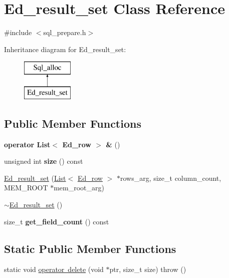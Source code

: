 \hypertarget{classEd__result__set}{}\section{Ed\+\_\+result\+\_\+set Class Reference}
\label{classEd__result__set}


{\ttfamily \#include $<$sql\+\_\+prepare.\+h$>$}

Inheritance diagram for Ed\+\_\+result\+\_\+set\+:\begin{figure}[H]
\begin{center}
\leavevmode
\includegraphics[height=2.000000cm]{classEd__result__set}
\end{center}
\end{figure}
\subsection*{Public Member Functions}
\begin{DoxyCompactItemize}
\item 
\mbox{\label{classEd__result__set_a9e91651b1015c127a3e17366d0e29570}} 
{\bfseries operator List$<$ Ed\+\_\+row $>$ \&} ()
\item 
\mbox{\label{classEd__result__set_ae1634455218db1e77df75f82586b4752}} 
unsigned int {\bfseries size} () const
\item 
\mbox{\hyperlink{classEd__result__set_a28ecefda6146f1314328ab6250009b43}{Ed\+\_\+result\+\_\+set}} (\mbox{\hyperlink{classList}{List}}$<$ \mbox{\hyperlink{classEd__row}{Ed\+\_\+row}} $>$ $\ast$rows\+\_\+arg, size\+\_\+t column\+\_\+count, M\+E\+M\+\_\+\+R\+O\+OT $\ast$mem\+\_\+root\+\_\+arg)
\item 
\mbox{\hyperlink{classEd__result__set_aa1b5f342e1cecd455b506d6b30738d4a}{$\sim$\+Ed\+\_\+result\+\_\+set}} ()
\item 
\mbox{\label{classEd__result__set_ad0ecedae357128d4ab06d5212c886807}} 
size\+\_\+t {\bfseries get\+\_\+field\+\_\+count} () const
\end{DoxyCompactItemize}
\subsection*{Static Public Member Functions}
\begin{DoxyCompactItemize}
\item 
static void \mbox{\hyperlink{classEd__result__set_a81f3670478a727c2747d61d680e851fe}{operator delete}} (void $\ast$ptr, size\+\_\+t size)  throw ()
\end{DoxyCompactItemize}
